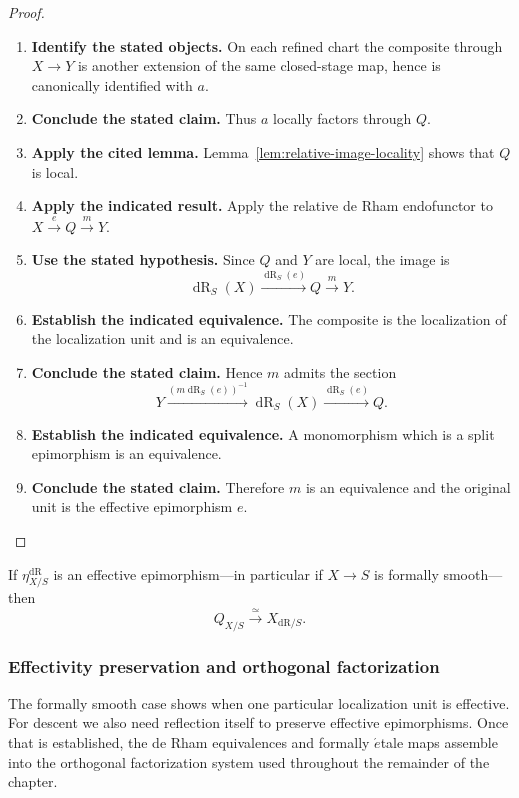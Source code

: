 \begin{proof}
\begin{enumerate}[label=\textup{(\arabic*)}]
    \(a:T\to Y\).
    \item \textbf{Identify the stated objects.}
    On each refined chart the composite through \(X\to Y\) is another
    extension of the same closed-stage map, hence is canonically identified with
    \(a\).
    \item \textbf{Conclude the stated claim.}
    Thus \(a\) locally factors through \(Q\).
    \item \textbf{Apply the cited lemma.}
    Lemma~\ref{lem:relative-image-locality}
    shows that \(Q\) is local.
    \item \textbf{Apply the indicated result.}
    Apply the relative de Rham endofunctor to
    \(X\xrightarrow eQ\xrightarrow mY\).
    \item \textbf{Use the stated hypothesis.}
    Since \(Q\) and \(Y\) are local, the image is
    \[
    \operatorname{dR}_S(X)
    \xrightarrow{\operatorname{dR}_S(e)}Q
    \xrightarrow{m}Y.
    \]
    \item \textbf{Establish the indicated equivalence.}
    The composite is the localization of the localization unit and is an equivalence.
    \item \textbf{Conclude the stated claim.}
    Hence \(m\) admits the section
    \[
    Y
    \xrightarrow{(m\operatorname{dR}_S(e))^{-1}}
    \operatorname{dR}_S(X)
    \xrightarrow{\operatorname{dR}_S(e)}Q.
    \]
    \item \textbf{Establish the indicated equivalence.}
    A monomorphism which is a split epimorphism is an equivalence.
    \item \textbf{Conclude the stated claim.}
    Therefore \(m\) is an
    equivalence and the original unit is the effective epimorphism \(e\).
\end{enumerate}
\end{proof}

\begin{corollary}
If \(\eta_{X/S}^{\mathrm{dR}}\) is an effective epimorphism---in particular if \(X\to S\) is formally
smooth---then
\[
  Q_{X/S}\xrightarrow{\simeq}X_{\mathrm{dR}/S}.
\]
\end{corollary}

\subsubsection{Effectivity preservation and orthogonal factorization}

The formally smooth case shows when one particular localization unit is
effective. For descent we also need reflection itself to preserve effective
epimorphisms. Once that is established, the de Rham equivalences and formally
\(\acute{e}\)tale maps assemble into the orthogonal factorization system used
throughout the remainder of the chapter.

